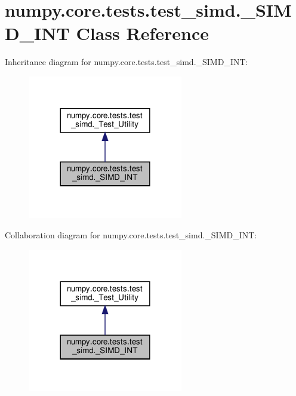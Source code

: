 \hypertarget{classnumpy_1_1core_1_1tests_1_1test__simd_1_1__SIMD__INT}{}\section{numpy.\+core.\+tests.\+test\+\_\+simd.\+\_\+\+S\+I\+M\+D\+\_\+\+I\+NT Class Reference}
\label{classnumpy_1_1core_1_1tests_1_1test__simd_1_1__SIMD__INT}


Inheritance diagram for numpy.\+core.\+tests.\+test\+\_\+simd.\+\_\+\+S\+I\+M\+D\+\_\+\+I\+NT\+:
\nopagebreak
\begin{figure}[H]
\begin{center}
\leavevmode
\includegraphics[width=192pt]{classnumpy_1_1core_1_1tests_1_1test__simd_1_1__SIMD__INT__inherit__graph}
\end{center}
\end{figure}


Collaboration diagram for numpy.\+core.\+tests.\+test\+\_\+simd.\+\_\+\+S\+I\+M\+D\+\_\+\+I\+NT\+:
\nopagebreak
\begin{figure}[H]
\begin{center}
\leavevmode
\includegraphics[width=192pt]{classnumpy_1_1core_1_1tests_1_1test__simd_1_1__SIMD__INT__coll__graph}
\end{center}
\end{figure}
